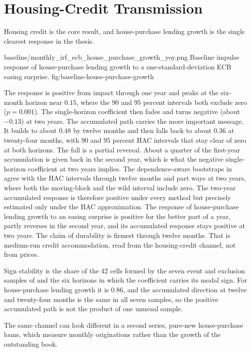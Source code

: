 \section{Housing-Credit Transmission}

Housing credit is the core result, and house-purchase lending growth is the single clearest response in the thesis.

\thesisfigure
  {baseline/monthly_irf_ecb_house_purchase_growth_yoy.png}
  {Baseline impulse response of house-purchase lending growth to a one-standard-deviation ECB easing surprise.}
  {fig:baseline-house-purchase-growth}

The response is positive from impact through one year and peaks at the six-month horizon near \(0.15\), where the \(90\) and \(95\) percent intervals both exclude zero (\(p=0.001\)). The single-horizon coefficient then fades and turns negative (about \(-0.13\)) at two years. The accumulated path carries the more important message. It builds to about \(0.48\) by twelve months and then falls back to about \(0.36\) at twenty-four months, with \(90\) and \(95\) percent HAC intervals that stay clear of zero at both horizons. The fall is a partial reversal. About a quarter of the first-year accumulation is given back in the second year, which is what the negative single-horizon coefficient at two years implies. The dependence-aware bootstraps in  agree with the HAC intervals through twelve months and part ways at two years, where both the moving-block and the wild interval include zero. The two-year accumulated response is therefore positive under every method but precisely estimated only under the HAC approximation. The response of house-purchase lending growth to an easing surprise is positive for the better part of a year, partly reverses in the second year, and its accumulated response stays positive at two years. The claim of durability is firmest through twelve months. That is medium-run credit accommodation, read from the housing-credit channel, not from prices.

Sign stability is the share of the 42 cells formed by the seven event and exclusion samples of  and the six horizons in which the coefficient carries its modal sign. For house-purchase lending growth it is \(0.86\), and the accumulated direction at twelve and twenty-four months is the same in all seven samples, so the positive accumulated path is not the product of one unusual sample.

The same channel can look different in a second series, pure-new house-purchase loans, which measure monthly originations rather than the growth of the outstanding book.

